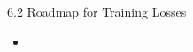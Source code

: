 \begin{frame}{6.2 Roadmap for Training Losses}
    \begin{itemize}
        \item
    \end{itemize}
\end{frame}
